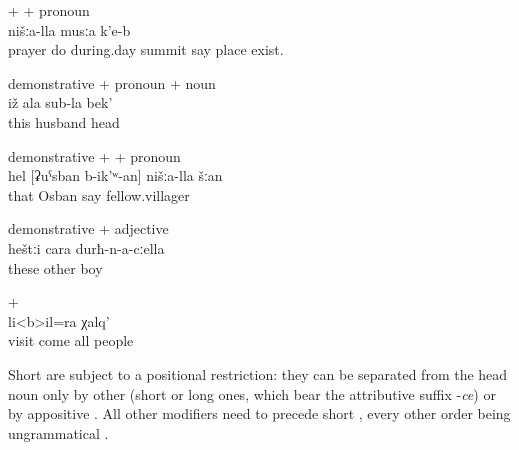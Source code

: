 \begin{exe}
		\ex	{} +  +  pronoun\\	\label{ex:There is our place, called the midday summit, the praying summit@10a}
		\gll{}	nišːa-lla	musːa	k'e-b\\
			prayer	do	during.day	summit	say		place	exist.\\
		\glt	{}

		\ex	demonstrative +  pronoun +  noun\\	\label{ex:your husband's head@10b}
		\gll	iž	ala	sub-la	bek'\\
			this		husband	head\\
		\glt	{}

		\ex	demonstrative +  +  pronoun\\	\label{ex:that our fellow villager called Osban}
		\gll	hel	[ʡuˁsban	b-ik'ʷ-an]	nišːa-lla	šːan\\
			that	Osban	say		fellow.villager\\
		\glt	{}


		\ex	demonstrative + adjective\\				\label{ex:with these other boys}
		\gll	heštːi	cara	durħ-n-a-cːella\\
			these	other	boy\\
		\glt	{}
		
				\ex	{} + \\		\label{ex:all people who had come for a visit@11b}
		\gll	[šːatːir	sa-b-ač'-ib-te]	li<b>il=ra	χalq'\\
			visit	come 	all	people\\
		\glt	{}

\end{exe}

Short  are subject to a positional restriction: they can be separated from the head noun only by other  (short or long ones, which bear the attributive suffix -\textit{ce})  or by appositive  . All other modifiers need to precede short  , every other order being ungrammatical .\largerpage

